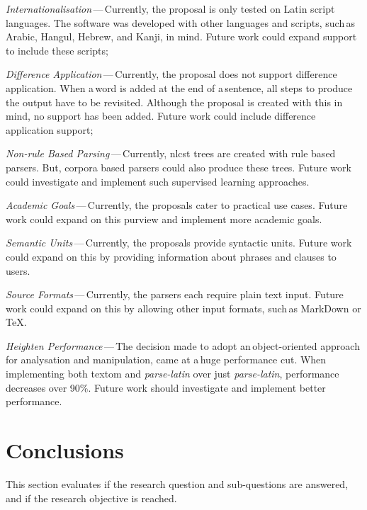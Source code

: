 \begin{aenumerate}
\item\emph{Internationalisation}\,---\,Currently, the proposal is only
    tested on Latin script languages.
  The software was developed with other languages and scripts, such\,as
    Arabic, Hangul, Hebrew, and Kanji, in mind.
  Future work could expand support to include these scripts;
\item\emph{Difference Application}\,---\,Currently, the proposal does not
    support difference application.
  When a\,word is added at the end of a\,sentence, all steps to produce the
    output have to be revisited.
  Although the proposal is created with this in mind, no support has been
    added.
  Future work could include difference application support;
\item\emph{Non-rule Based Parsing}\,---\,Currently, \gls{nlcst} trees are
    created with rule based parsers.
  But, corpora based parsers could also produce these trees.
  Future work could investigate and implement such supervised learning
    approaches.
\item\emph{Academic Goals}\,---\,Currently, the proposals cater to practical use
    cases.
  Future work could expand on this purview and implement more academic
    goals.
\item\emph{Semantic Units}\,---\,Currently, the proposals provide syntactic
    units.
  Future work could expand on this by providing information about phrases
    and clauses to users.
\item\emph{Source Formats}\,---\,Currently, the parsers each require plain
    text input.
  Future work could expand on this by allowing other input formats, such\,as
    MarkDown or \TeX.
\item\emph{Heighten Performance}\,---\,The decision made to adopt
    an\,object-oriented approach for analysation and manipulation, came at
    a\,huge performance cut.
  When implementing both \gls{textom} and \emph{parse-latin} over just
    \emph{parse-latin}, performance decreases over 90\%.
  Future work should investigate and implement better performance.
\end{aenumerate}

\section{Conclusions}\label{conclusions}

This section evaluates if the research question and sub-questions are
  answered, and if the research objective is reached.

